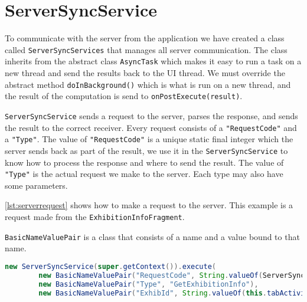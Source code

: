 \section{ServerSyncService}

To communicate with the server from the application we have created a class called \lstinline|ServerSyncServices| that manages all server communication. The class inherits from the abstract class \lstinline|AsyncTask| which makes it easy to run a task on a new thread and send the results back to the UI thread. We must override the abstract method \lstinline|doInBackground()| which is what is run on a new thread, and the result of the computation is send to \lstinline|onPostExecute(result)|.

\lstinline|ServerSyncService| sends a request to the server, parses the response, and sends the result to the correct receiver. Every request consists of a \lstinline|"RequestCode"| and a \lstinline|"Type"|. The value of \lstinline|"RequestCode"| is a unique static final integer which the server sends back as part of the result, we use it in the \lstinline|ServerSyncService| to know how to process the response and where to send the result. The value of \lstinline|"Type"| is the actual request we make to the server. Each type may also have some parameters. 

\autoref{lst:serverrequest} shows how to make a request to the server. This example is a request made from the \lstinline|ExhibitionInfoFragment|.

\lstinline|BasicNameValuePair| is a class that consists of a name and a value bound to that name. 

\begin{lstlisting}[language=java, label=lst:serverrequest, caption={Get exhibition information request}]
new ServerSyncService(super.getContext()).execute(
        new BasicNameValuePair("RequestCode", String.valueOf(ServerSyncService.GET_EXHIBITION_INFO)),
        new BasicNameValuePair("Type", "GetExhibitionInfo"),
        new BasicNameValuePair("ExhibId", String.valueOf(this.tabActivity.getExhibId());
\end{lstlisting}

